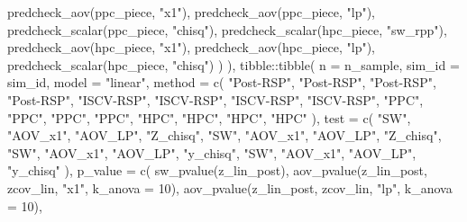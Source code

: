 \documentclass[
  english,
  letterpaper,
  DIV=11,
  numbers=noendperiod]{scrartcl}
\newenvironment{Shaded}{\begin{snugshade}}{\end{snugshade}}
\newcommand{\AttributeTok}[1]{\textcolor[rgb]{0.40,0.45,0.13}{#1}}
\newcommand{\DecValTok}[1]{\textcolor[rgb]{0.68,0.00,0.00}{#1}}
\newcommand{\FunctionTok}[1]{\textcolor[rgb]{0.28,0.35,0.67}{#1}}
\newcommand{\NormalTok}[1]{\textcolor[rgb]{0.00,0.23,0.31}{#1}}
\newcommand{\SpecialCharTok}[1]{\textcolor[rgb]{0.37,0.37,0.37}{#1}}
\newcommand{\StringTok}[1]{\textcolor[rgb]{0.13,0.47,0.30}{#1}}
\begin{document}
\begin{Shaded}
\begin{Highlighting}[]
        \FunctionTok{predcheck\_aov}\NormalTok{(ppc\_piece, }\StringTok{"x1"}\NormalTok{),}
        \FunctionTok{predcheck\_aov}\NormalTok{(ppc\_piece, }\StringTok{"lp"}\NormalTok{),}
        \FunctionTok{predcheck\_scalar}\NormalTok{(ppc\_piece, }\StringTok{"chisq"}\NormalTok{),}
        \FunctionTok{predcheck\_scalar}\NormalTok{(hpc\_piece, }\StringTok{"sw\_rpp"}\NormalTok{),}
        \FunctionTok{predcheck\_aov}\NormalTok{(hpc\_piece, }\StringTok{"x1"}\NormalTok{),}
        \FunctionTok{predcheck\_aov}\NormalTok{(hpc\_piece, }\StringTok{"lp"}\NormalTok{),}
        \FunctionTok{predcheck\_scalar}\NormalTok{(hpc\_piece, }\StringTok{"chisq"}\NormalTok{)}
\NormalTok{      )}
\NormalTok{    ),}
\NormalTok{    tibble}\SpecialCharTok{::}\FunctionTok{tibble}\NormalTok{(}
      \AttributeTok{n =}\NormalTok{ n\_sample,}
      \AttributeTok{sim\_id =}\NormalTok{ sim\_id,}
      \AttributeTok{model =} \StringTok{"linear"}\NormalTok{,}
      \AttributeTok{method =} \FunctionTok{c}\NormalTok{(}
        \StringTok{"Post{-}RSP"}\NormalTok{, }\StringTok{"Post{-}RSP"}\NormalTok{, }\StringTok{"Post{-}RSP"}\NormalTok{, }\StringTok{"Post{-}RSP"}\NormalTok{,}
        \StringTok{"ISCV{-}RSP"}\NormalTok{, }\StringTok{"ISCV{-}RSP"}\NormalTok{, }\StringTok{"ISCV{-}RSP"}\NormalTok{, }\StringTok{"ISCV{-}RSP"}\NormalTok{,}
        \StringTok{"PPC"}\NormalTok{, }\StringTok{"PPC"}\NormalTok{, }\StringTok{"PPC"}\NormalTok{, }\StringTok{"PPC"}\NormalTok{,}
        \StringTok{"HPC"}\NormalTok{, }\StringTok{"HPC"}\NormalTok{, }\StringTok{"HPC"}\NormalTok{, }\StringTok{"HPC"}
\NormalTok{      ),}
      \AttributeTok{test =} \FunctionTok{c}\NormalTok{(}
        \StringTok{"SW"}\NormalTok{, }\StringTok{"AOV\_x1"}\NormalTok{, }\StringTok{"AOV\_LP"}\NormalTok{, }\StringTok{"Z\_chisq"}\NormalTok{,}
        \StringTok{"SW"}\NormalTok{, }\StringTok{"AOV\_x1"}\NormalTok{, }\StringTok{"AOV\_LP"}\NormalTok{, }\StringTok{"Z\_chisq"}\NormalTok{,}
        \StringTok{"SW"}\NormalTok{, }\StringTok{"AOV\_x1"}\NormalTok{, }\StringTok{"AOV\_LP"}\NormalTok{, }\StringTok{"y\_chisq"}\NormalTok{,}
        \StringTok{"SW"}\NormalTok{, }\StringTok{"AOV\_x1"}\NormalTok{, }\StringTok{"AOV\_LP"}\NormalTok{, }\StringTok{"y\_chisq"}
\NormalTok{      ),}
      \AttributeTok{p\_value =} \FunctionTok{c}\NormalTok{(}
        \FunctionTok{sw\_pvalue}\NormalTok{(z\_lin\_post),}
        \FunctionTok{aov\_pvalue}\NormalTok{(z\_lin\_post, zcov\_lin, }\StringTok{"x1"}\NormalTok{, }\AttributeTok{k\_anova =} \DecValTok{10}\NormalTok{),}
        \FunctionTok{aov\_pvalue}\NormalTok{(z\_lin\_post, zcov\_lin, }\StringTok{"lp"}\NormalTok{, }\AttributeTok{k\_anova =} \DecValTok{10}\NormalTok{),}

\end{Highlighting}
\end{Shaded}
\end{document}
